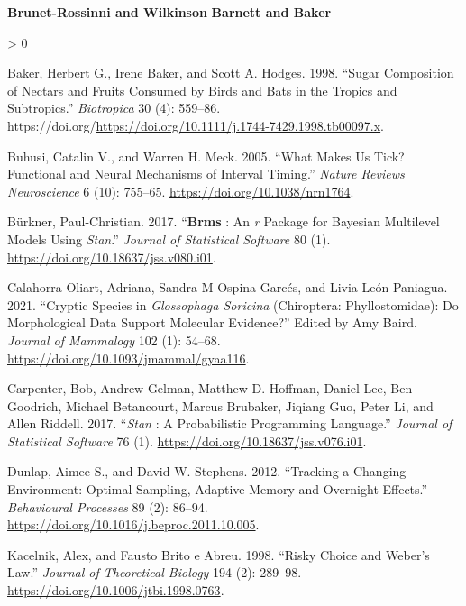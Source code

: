 \documentclass[
]{article}
\newlength{\cslhangindent}
\newenvironment{CSLReferences}[2] %
 {%
  \setlength{\parindent}{0pt}
  \ifodd #1 \everypar{\setlength{\hangindent}{\cslhangindent}}\ignorespaces\fi
  \ifnum #2 > 0
  \setlength{\parskip}{#2\baselineskip}
  \fi
 }%
 {}
\begin{document}
\textbf{Brunet-Rossinni and Wilkinson}
\textbf{Barnett and Baker}

\hypertarget{refs}{}
\begin{CSLReferences}{1}{0}
\leavevmode\hypertarget{ref-baker_sugar_1998}{}%
Baker, Herbert G., Irene Baker, and Scott A. Hodges. 1998. {``Sugar {Composition} of {Nectars} and {Fruits} {Consumed} by {Birds} and {Bats} in the {Tropics} and {Subtropics}.''} \emph{Biotropica} 30 (4): 559--86. https://doi.org/\url{https://doi.org/10.1111/j.1744-7429.1998.tb00097.x}.

\leavevmode\hypertarget{ref-buhusi_what_2005}{}%
Buhusi, Catalin V., and Warren H. Meck. 2005. {``What Makes Us Tick? {Functional} and Neural Mechanisms of Interval Timing.''} \emph{Nature Reviews Neuroscience} 6 (10): 755--65. \url{https://doi.org/10.1038/nrn1764}.

\leavevmode\hypertarget{ref-burkner_brms_2017}{}%
Bürkner, Paul-Christian. 2017. {``\textbf{Brms} : {An} \emph{r} {Package} for {Bayesian} {Multilevel} {Models} {Using} \emph{Stan}.''} \emph{Journal of Statistical Software} 80 (1). \url{https://doi.org/10.18637/jss.v080.i01}.

\leavevmode\hypertarget{ref-calahorra-oliart_cryptic_2021}{}%
Calahorra-Oliart, Adriana, Sandra M Ospina-Garcés, and Livia León-Paniagua. 2021. {``Cryptic Species in \emph{{Glossophaga} Soricina} ({Chiroptera}: {Phyllostomidae}): Do Morphological Data Support Molecular Evidence?''} Edited by Amy Baird. \emph{Journal of Mammalogy} 102 (1): 54--68. \url{https://doi.org/10.1093/jmammal/gyaa116}.

\leavevmode\hypertarget{ref-carpenter_stan_2017}{}%
Carpenter, Bob, Andrew Gelman, Matthew D. Hoffman, Daniel Lee, Ben Goodrich, Michael Betancourt, Marcus Brubaker, Jiqiang Guo, Peter Li, and Allen Riddell. 2017. {``\emph{Stan} : {A} {Probabilistic} {Programming} {Language}.''} \emph{Journal of Statistical Software} 76 (1). \url{https://doi.org/10.18637/jss.v076.i01}.

\leavevmode\hypertarget{ref-dunlap_tracking_2012}{}%
Dunlap, Aimee S., and David W. Stephens. 2012. {``Tracking a Changing Environment: Optimal Sampling, Adaptive Memory and Overnight Effects.''} \emph{Behavioural Processes} 89 (2): 86--94. \url{https://doi.org/10.1016/j.beproc.2011.10.005}.

\leavevmode\hypertarget{ref-kacelnik_risky_1998}{}%
Kacelnik, Alex, and Fausto Brito e Abreu. 1998. {``Risky {Choice} and {Weber}'s {Law}.''} \emph{Journal of Theoretical Biology} 194 (2): 289--98. \url{https://doi.org/10.1006/jtbi.1998.0763}.


\end{CSLReferences}
\end{document}
